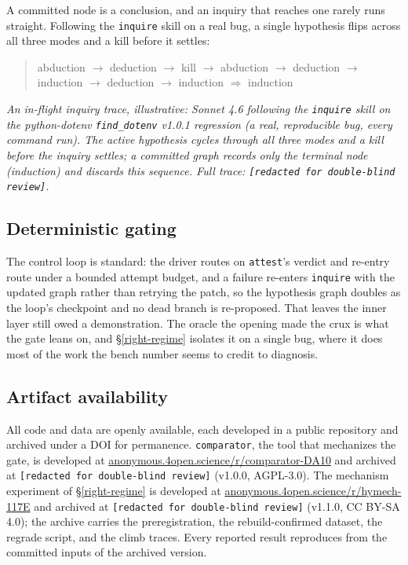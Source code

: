 \documentclass[
  10pt,
]{article}
\begin{document}
A committed node is a conclusion, and an inquiry that reaches one rarely
runs straight. Following the \texttt{inquire} skill on a real bug, a
single hypothesis flips across all three modes and a kill before it
settles:

\begin{quote}
abduction \(\rightarrow\) deduction \(\rightarrow\) kill \(\rightarrow\)
abduction \(\rightarrow\) deduction \(\rightarrow\) induction
\(\rightarrow\) deduction \(\rightarrow\) induction \(\Rightarrow\)
induction
\end{quote}

\emph{An in-flight inquiry trace, illustrative: Sonnet 4.6 following the
\texttt{inquire} skill on the python-dotenv \texttt{find\_dotenv} v1.0.1
regression (a real, reproducible bug, every command run). The active
hypothesis cycles through all three modes and a kill before the inquiry
settles; a committed graph records only the terminal node (induction)
and discards this sequence. Full trace:
\texttt{[redacted for double-blind review]}.}

\subsection{Deterministic gating}\label{gating}

The control loop is standard: the driver routes on \texttt{attest}'s
verdict and re-entry route under a bounded attempt budget, and a failure
re-enters \texttt{inquire} with the updated graph rather than retrying
the patch, so the hypothesis graph doubles as the loop's checkpoint and
no dead branch is re-proposed. That leaves the inner layer still owed a
demonstration. The oracle the opening made the crux is what the gate
leans on, and \S\ref{right-regime} isolates it on a single bug, where it
does most of the work the bench number seems to credit to diagnosis.

\subsection{Artifact availability}\label{artifact}

All code and data are openly available, each developed in a public
repository and archived under a DOI for permanence. \texttt{comparator},
the tool that mechanizes the gate, is developed at
\href{https://anonymous.4open.science/r/comparator-DA10}{anonymous.4open.science/r/comparator-DA10}
and archived at
\texttt{[redacted for double-blind review]}
(v1.0.0, AGPL-3.0). The mechanism experiment of \S\ref{right-regime} is
developed at
\href{https://anonymous.4open.science/r/hymech-117E}{anonymous.4open.science/r/hymech-117E}
and archived at
\texttt{[redacted for double-blind review]}
(v1.1.0, CC BY-SA 4.0); the archive carries the preregistration, the
rebuild-confirmed dataset, the regrade script, and the climb traces.
Every reported result reproduces from the committed inputs of the
archived version.
\end{document}
